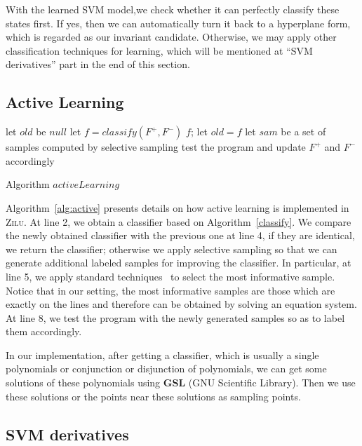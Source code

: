 With the learned SVM model,we check whether it can perfectly classify these states first.
If yes, then we can automatically turn it back to a hyperplane form, which is regarded as our invariant candidate.
Otherwise, we may apply other classification techniques for learning, which will be mentioned at ``SVM derivatives'' part in the end of this section.


\subsection{Active Learning} 
\begin{algorithm}[h]
\SetAlgoVlined
\Indm
{}
\Indp
let $old$ be $null$\;
 {
    let $f = classify(F^+, F^-)$\;
     {
        \Return $f$;
    }
    let $old = f$\;
    let $sam$ be a set of samples computed by selective sampling\;
    test the program and update $F^+$ and $F^-$ accordingly\;
}
\caption{Algorithm $activeLearning$}
\label{alg:active}
\end{algorithm}

Algorithm~\ref{alg:active} presents details on how active learning is implemented in \textsc{Zilu}. 
At line 2, we obtain a classifier based on Algorithm~\ref{classify}. 
We compare the newly obtained classifier with the previous one at line 4, if they are identical, we return the classifier; 
otherwise we apply selective sampling so that we can generate additional labeled samples for improving the classifier. 
In particular, at line 5, we apply standard techniques~\cite{DBLP:conf/icml/SchohnC00} to select the most informative sample. 
Notice that in our setting, the most informative samples are those which are exactly on the lines and therefore can be obtained by solving an equation system. 
At line 8, we test the program with the newly generated samples so as to label them accordingly.

In our implementation, after getting a classifier, which is usually a single polynomials or conjunction or disjunction of polynomials,
we can get some solutions of these polynomials using \textbf{GSL} (GNU Scientific Library).
Then we use these solutions or the points near these solutions as sampling points.



\subsection{SVM derivatives}

